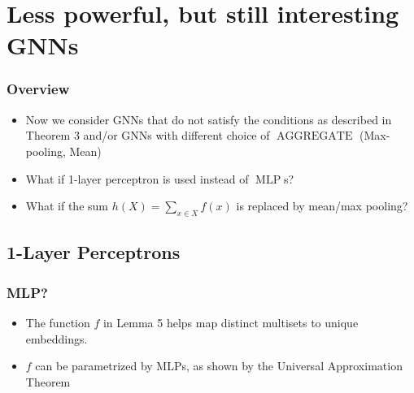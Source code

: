 \documentclass{beamer}
\DeclareMathOperator{\aggregate}{AGGREGATE}
\DeclareMathOperator{\mlp}{MLP}
\begin{document}

\section{Less powerful, but still interesting GNNs}

\begin{frame}
\frametitle{Overview}

\begin{itemize}
	\item Now we consider GNNs that do not satisfy the conditions as described in Theorem 3 and/or GNNs with different choice of $\aggregate$ (Max-pooling, Mean) \pause
	
	\item What if 1-layer perceptron is used instead of $\mlp$s? \pause
	
	\item What if the sum $h(X) = \sum_{x \in X} f(x)$ is replaced by mean/max pooling?
	
\end{itemize}
\end{frame}


\subsection{1-Layer Perceptrons}

\begin{frame}
\frametitle{MLP?}

\begin{itemize}
	\item The function $f$ in Lemma 5 helps map distinct multisets to unique embeddings. \pause
	
	\item $f$ can be parametrized by MLPs, as shown by the Universal Approximation Theorem
	
\end{itemize}

\end{frame}

\end{document}
